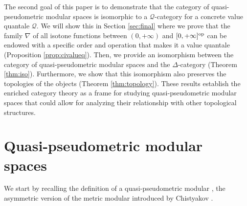 \documentclass[11pt,a4paper]{amsart}
\theoremstyle{definition}
\begin{document}
	The second goal of this paper is to demonstrate that the category of quasi-pseudometric modular spaces is isomorphic to a $\mathscr{Q}$-category for a concrete value quantale $\mathscr{Q}$. We will show this in Section \ref{sec:final} where we prove that the family $\nabla$ of all isotone functions between $(0,+\infty)$ and $[0,+\infty]^\text{\normalfont op}$ can be endowed with a specific order and operation that makes it a value quantale (Proposition \ref{prop:civalueq}). Then, we provide an isomorphism between the category of quasi-pseudometric modular spaces and the $\Delta$-category (Theorem \ref{thm:iso}). Furthermore, we show that this isomorphism also preserves the topologies of the objects (Theorem \ref{thm:topology}).
	These results establish the enriched category theory as a frame for studying quasi-pseudometric modular spaces that could allow for analyzing their relationship with other topological structures.
	
	
	
	\section{Quasi-pseudometric modular spaces}\label{sec:qpmms}
	
	We start by recalling the definition of a quasi-pseudometric modular \cite{SebogodiPhD}, the asymmetric version of the metric modular introduced by Chistyakov \cite{Chis10a,Chis15}.
	
\end{document}
